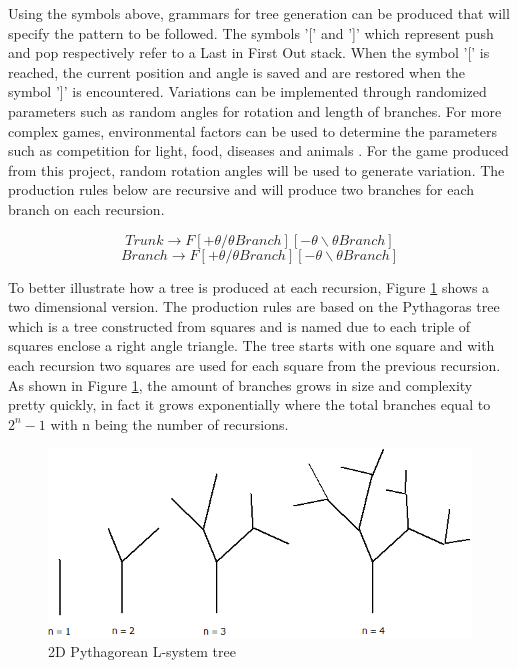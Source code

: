 Using the symbols above, grammars for tree generation can be produced that will specify the pattern to be followed. The symbols '[' and ']'  which represent push and pop respectively refer to a Last in First Out stack. When the symbol '[' is reached, the current position and angle is saved and are restored when the symbol ']' is encountered. Variations can be implemented through randomized parameters such as random angles for rotation and length of branches. For more complex games, environmental factors can be used to determine the parameters such as competition for light, food, diseases and animals \cite{plantslecture}. For the game produced from this project, random rotation angles will be used to generate variation. The production rules below are recursive and will produce two branches for each branch on each recursion.


\[Trunk \rightarrow F[+\theta /\theta Branch][-\theta \backslash\theta Branch]\]
\[Branch \rightarrow F[+\theta /\theta Branch][-\theta \backslash\theta Branch]\]

To better illustrate how a tree is produced at each recursion, Figure \ref{fig:tree} shows a two dimensional version. The production rules are based on the Pythagoras tree which is a tree constructed from squares and is named due to each triple of squares enclose a right angle triangle. The tree starts with one square and with each recursion two squares are used for each square from the previous recursion. As shown in Figure \ref{fig:tree}, the amount of branches grows in size and complexity pretty quickly, in fact it grows exponentially where the total branches equal to \(2^n - 1\) with n being the number of recursions.

\begin{figure}[h!]
 \centering
 \includegraphics[width=0.8\linewidth]{images/tree.png}
 \caption{2D Pythagorean L-system tree}
 \label{fig:tree}
\end{figure}

